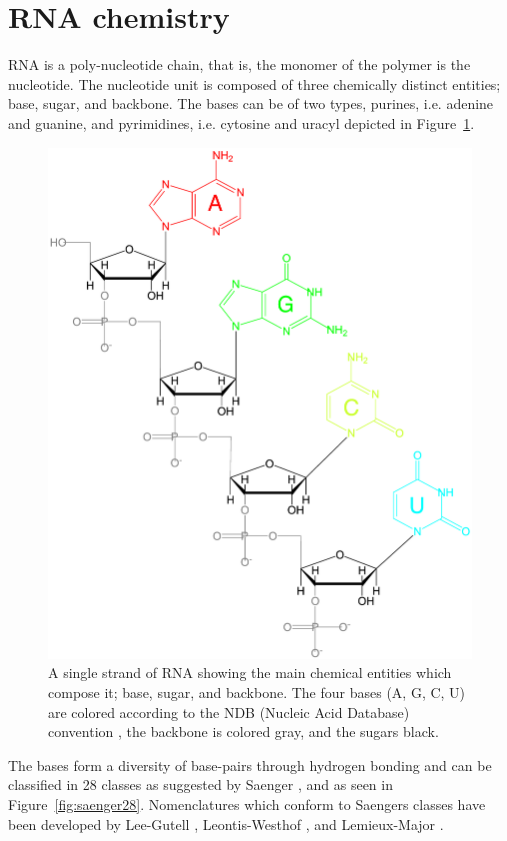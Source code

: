 \section{RNA chemistry}
RNA is a poly-nucleotide chain, that is, the monomer of the polymer is
the nucleotide.  The nucleotide unit  is composed of  three chemically
distinct entities; base, sugar, and backbone. The bases can be of two
types, purines, i.e. adenine and guanine, and pyrimidines,
i.e. cytosine and uracyl depicted in Figure~\ref{fig:chemistry1}.
\begin{figure}
\centering
\includegraphics[scale=0.4]{Chapter1/chemistry1.png}
\caption{A  single strand of  RNA showing  the main  chemical entities
  which compose it; base, sugar, and backbone.  The four bases (A, G,
  C,  U) are  colored according  to  the NDB  (Nucleic Acid  Database)
  convention \cite{ndburl}, the backbone is colored gray, and
  the sugars black.}
\label{fig:chemistry1}
\end{figure}  

The bases form a diversity  of base-pairs through hydrogen bonding and
can   be  classified   in   28  classes   as   suggested  by   Saenger
\cite{saenger1984},   and  as   seen   in  Figure~\ref{fig:saenger28}.
Nomenclatures which conform to Saengers classes have been developed by
Lee-Gutell  \cite{lee2004},  Leontis-Westhof \cite{leontis2002b},  and
Lemieux-Major \cite{lemieux2002}.

